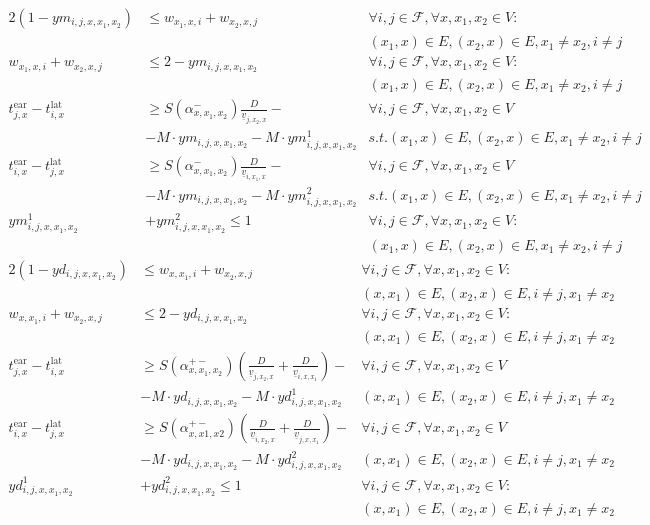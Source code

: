 \documentclass[../thesis.tex]{subfiles}
\begin{document}
\begin{align}
    2(1-ym_{i,j,x,x_1,x_2})& \leq w_{x_1,x,i} + w_{x_2,x,j} & \forall i,j\in\mathcal F,\forall x,x_1,x_2\in V:\nonumber\\&&
    (x_1,x)\in E, (x_2,x)\in E, x_1\neq x_2, i\neq j\\
    w_{x_1,x,i} + w_{x_2,x,j} &\leq 2- ym_{i,j,x,x_1,x_2}& \forall i,j\in\mathcal F,\forall x,x_1,x_2\in V:\nonumber\\&&
    (x_1,x)\in E, (x_2,x)\in E, x_1\neq x_2, i\neq j\\
    t^\text{ear}_{j,x}-t^\text{lat}_{i,x}&\geq S(\alpha^-_{x,x_1,x_2})\frac D{\underline v_{j,x_2,x}}- &\forall i,j\in\mathcal F,\forall x,x_1,x_2\in V
    \nonumber\\
    &-M\cdot ym_{i,j,x,x_1,x_2}- M\cdot ym^1_{i,j,x,x_1,x_2} 
    & s.t. (x_1,x)\in E, (x_2,x)\in E, x_1\neq x_2, i\neq j\\   
    t^\text{ear}_{i,x}-t^\text{lat}_{j,x}&\geq S(\alpha^-_{x,x_1,x_2})\frac D{\underline v_{i,x_1,x}}- & \forall i,j\in\mathcal F,\forall x,x_1,x_2\in V\nonumber \\
    &- M\cdot ym_{i,j,x,x_1,x_2}- M\cdot ym^2_{i,j,x,x_1,x_2}
    & s.t. (x_1,x)\in E, (x_2,x)\in E, x_1\neq x_2, i\neq j\\
    ym^1_{i,j,x,x_1,x_2} &+ ym^2_{i,j,x,x_1,x_2}\leq 1& \forall i,j\in\mathcal F,\forall x,x_1,x_2\in V:
    \nonumber\\&& (x_1,x)\in E, (x_2,x)\in E, x_1\neq x_2, i\neq j
\end{align}
\begin{align}
    2(1-yd_{i,j,x,x_1,x_2})& \leq w_{x,x_1,i} + w_{x_2,x,j} 
    & \forall i,j\in\mathcal F,\forall x,x_1,x_2\in V:
    \nonumber\\&& (x,x_1)\in E,(x_2,x)\in E, i\neq j, x_1\neq x_2\\
    w_{x,x_1,i} + w_{x_2,x,j} &\leq 2- yd_{i,j,x,x_1,x_2}
    &\forall i,j\in\mathcal F,\forall x,x_1,x_2\in V:
    \nonumber\\&& (x,x_1)\in E,(x_2,x)\in E, i\neq j, x_1\neq x_2\\
    t^\text{ear}_{j,x}-t^\text{lat}_{i,x}&\geq S(\alpha^{+-}_{x,x_1,x_2})\left(\frac D{\underline v_{j,x_2,x}} + \frac D{\underline v_{i,x,x_1}}\right)-
    &\forall i,j\in\mathcal F,\forall x,x_1,x_2\in V \nonumber
    \\&- M\cdot yd_{i,j,x,x_1,x_2}- M\cdot yd^1_{i,j,x,x_1,x_2} 
    & (x,x_1)\in E,(x_2,x)\in E, i\neq j, x_1\neq x_2\\
    t^\text{ear}_{i,x}-t^\text{lat}_{j,x}&\geq S(\alpha^{+-}_{x,x1,x2})\left(\frac D{\underline v_{i,x_2,x}}+\frac D{\underline v_{j,x,x_1}}\right)-     
    &\forall i,j\in\mathcal F,\forall x,x_1,x_2\in V    \nonumber\\&
    - M\cdot yd_{i,j,x,x_1,x_2}- M\cdot yd^2_{i,j,x,x_1,x_2}
    & (x,x_1)\in E,(x_2,x)\in E, i\neq j, x_1\neq x_2\\
    yd^1_{i,j,x,x_1,x_2} &+ yd^2_{i,j,x,x_1,x_2}\leq 1&
    \forall i,j\in\mathcal F,\forall x,x_1,x_2\in V:
    \nonumber\\&& (x,x_1)\in E,(x_2,x)\in E, i\neq j, x_1\neq x_2
\end{align}
\end{document}
